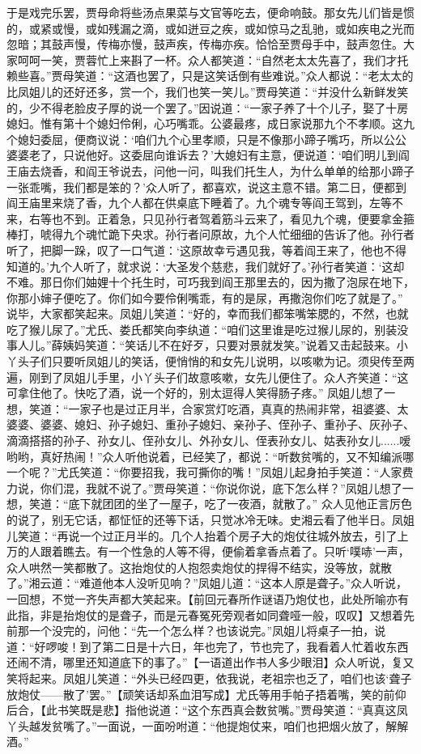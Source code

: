 \documentclass[12pt,oneside]{book}
\begin{document}
于是戏完乐罢，贾母命将些汤点果菜与文官等吃去，便命响鼓。那女先儿们皆是惯的，或紧或慢，或如残漏之滴，或如迸豆之疾，或如惊马之乱驰，或如疾电之光而忽暗；其鼓声慢，传梅亦慢，鼓声疾，传梅亦疾。恰恰至贾母手中，鼓声忽住。大家呵呵一笑，贾蓉忙上来斟了一杯。众人都笑道：“自然老太太先喜了，我们才托赖些喜。”贾母笑道：“这酒也罢了，只是这笑话倒有些难说。”众人都说：“老太太的比凤姐儿的还好还多，赏一个，我们也笑一笑儿。”贾母笑道：“并没什么新鲜发笑的，少不得老脸皮子厚的说一个罢了。”因说道：“一家子养了十个儿子，娶了十房媳妇。惟有第十个媳妇伶俐，心巧嘴乖。公婆最疼，成日家说那九个不孝顺。这九个媳妇委屈，便商议说：‘咱们九个心里孝顺，只是不像那小蹄子嘴巧，所以公公婆婆老了，只说他好。这委屈向谁诉去？’大媳妇有主意，便说道：‘咱们明儿到阎王庙去烧香，和阎王爷说去，问他一问，叫我们托生人，为什么单单的给那小蹄子一张乖嘴，我们都是笨的？’众人听了，都喜欢，说这主意不错。第二日，便都到阎王庙里来烧了香，九个人都在供桌底下睡着了。九个魂专等阎王驾到，左等不来，右等也不到。正着急，只见孙行者驾着筋斗云来了，看见九个魂，便要拿金箍棒打，唬得九个魂忙跪下央求。孙行者问原故，九个人忙细细的告诉了他。孙行者听了，把脚一跺，叹了一口气道：‘这原故幸亏遇见我，等着阎王来了，他也不得知道的。’九个人听了，就求说：‘大圣发个慈悲，我们就好了。’孙行者笑道：‘这却不难。那日你们妯娌十个托生时，可巧我到阎王那里去的，因为撒了泡尿在地下，你那小婶子便吃了。你们如今要伶俐嘴乖，有的是尿，再撒泡你们吃了就是了。”
说毕，大家都笑起来。凤姐儿笑道：“好的，幸而我们都笨嘴笨腮的，不然，也就吃了猴儿尿了。”尤氏、娄氏都笑向李纨道：“咱们这里谁是吃过猴儿尿的，别装没事人儿。”薛姨妈笑道：“笑话儿不在好歹，只要对景就发笑。”说着又击起鼓来。小丫头子们只要听凤姐儿的笑话，便悄悄的和女先儿说明，以咳嗽为记。须臾传至两遍，刚到了凤姐儿手里，小丫头子们故意咳嗽，女先儿便住了。众人齐笑道：“这可拿住他了。快吃了酒，说一个好的，别太逗得人笑得肠子疼。”
凤姐儿想了一想，笑道：“一家子也是过正月半，合家赏灯吃酒，真真的热闹非常，祖婆婆、太婆婆、婆婆、媳妇、孙子媳妇、重孙子媳妇、亲孙子、侄孙子、重孙子、灰孙子、滴滴搭搭的孙子、孙女儿、侄孙女儿、外孙女儿、侄表孙女儿、姑表孙女儿......嗳哟哟，真好热闹！”众人听他说着，已经笑了，都说：“听数贫嘴的，又不知编派哪一个呢？”尤氏笑道：“你要招我，我可撕你的嘴！”凤姐儿起身拍手笑道：“人家费力说，你们混，我就不说了。”贾母笑道：“你说你说，底下怎么样？”凤姐儿想了一想，笑道：“底下就团团的坐了一屋子，吃了一夜酒，就散了。”
众人见他正言厉色的说了，别无它话，都怔怔的还等下话，只觉冰冷无味。史湘云看了他半日。凤姐儿笑道：“再说一个过正月半的。几个人抬着个房子大的炮仗往城外放去，引了上万的人跟着瞧去。有一个性急的人等不得，便偷着拿香点着了。只听‘噗哧’一声，众人哄然一笑都散了。这抬炮仗的人抱怨卖炮仗的捍得不结实，没等放，就散了。”湘云道：“难道他本人没听见响？”凤姐儿道：“这本人原是聋子。”众人听说，一回想，不觉一齐失声都大笑起来。【前回元春所作谜语乃炮仗也，此处所喻亦有此指，非是抬炮仗的是聋子，而是元春冤死旁观者如同聋哑一般，叹叹】又想着先前那一个没完的，问他：“先一个怎么样？也该说完。”凤姐儿将桌子一拍，说道：“好啰唆！到了第二日是十六日，年也完了，节也完了，我看着人忙着收东西还闹不清，哪里还知道底下的事了。”【一语道出作书人多少眼泪】众人听说，复又笑将起来。凤姐儿笑道：“外头已经四更，依我说，老祖宗也乏了，咱们也该‘聋子放炮仗——散了’罢。”【顽笑话却系血泪写成】尤氏等用手帕子捂着嘴，笑的前仰后合，【此书笑既是悲】指他说道：“这个东西真会数贫嘴。”贾母笑道：“真真这凤丫头越发贫嘴了。”一面说，一面吩咐道：“他提炮仗来，咱们也把烟火放了，解解酒。”
\end{document}
